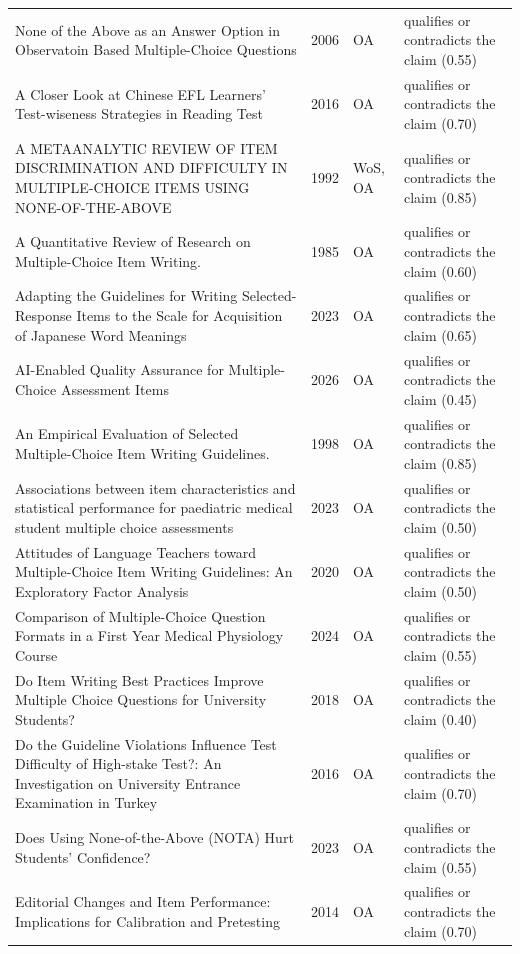 \begin{longtable}{@{}%
  >{\raggedright\arraybackslash}p{}c%
  >{\raggedright\arraybackslash}p{}%
  >{\raggedright\arraybackslash}p{}@{}}
\textquotedbl{}None of the Above\textquotedbl{} as an Answer Option in Observatoin Based Multiple-Choice Questions & 2006 & OA & qualifies or contradicts the claim (0.55) \\
A Closer Look at Chinese EFL Learners' Test-wiseness Strategies in Reading Test & 2016 & OA & qualifies or contradicts the claim (0.70) \\
A METAANALYTIC REVIEW OF ITEM DISCRIMINATION AND DIFFICULTY IN MULTIPLE-CHOICE ITEMS USING NONE-OF-THE-ABOVE & 1992 & WoS, OA & qualifies or contradicts the claim (0.85) \\
A Quantitative Review of Research on Multiple-Choice Item Writing. & 1985 & OA & qualifies or contradicts the claim (0.60) \\
Adapting the Guidelines for Writing Selected-Response Items to the Scale for Acquisition of Japanese Word Meanings & 2023 & OA & qualifies or contradicts the claim (0.65) \\
AI-Enabled Quality Assurance for Multiple-Choice Assessment Items & 2026 & OA & qualifies or contradicts the claim (0.45) \\
An Empirical Evaluation of Selected Multiple-Choice Item Writing Guidelines. & 1998 & OA & qualifies or contradicts the claim (0.85) \\
Associations between item characteristics and statistical performance for paediatric medical student multiple choice assessments & 2023 & OA & qualifies or contradicts the claim (0.50) \\
Attitudes of Language Teachers toward Multiple-Choice Item Writing Guidelines: An Exploratory Factor Analysis & 2020 & OA & qualifies or contradicts the claim (0.50) \\
Comparison of Multiple-Choice Question Formats in a First Year Medical Physiology Course & 2024 & OA & qualifies or contradicts the claim (0.55) \\
Do Item Writing Best Practices Improve Multiple Choice Questions for University Students? & 2018 & OA & qualifies or contradicts the claim (0.40) \\
Do the Guideline Violations Influence Test Difficulty of High-stake Test?: An Investigation on University Entrance Examination in Turkey & 2016 & OA & qualifies or contradicts the claim (0.70) \\
Does Using None-of-the-Above (NOTA) Hurt Students' Confidence? & 2023 & OA & qualifies or contradicts the claim (0.55) \\
Editorial Changes and Item Performance: Implications for Calibration and Pretesting & 2014 & OA & qualifies or contradicts the claim (0.70) \\

\end{longtable}
